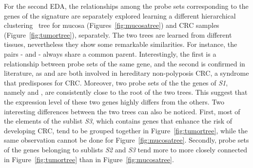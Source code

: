 For the second EDA, the relationships among the probe sets corresponding to the genes of the signature are separately explored learning a different hierarchical clustering~\cite{hastie2009elements} tree for mucosa (Figures~\ref{fig:mucosatree}) and CRC samples (Figure~\ref{fig:tumortree}), separately.
The two trees are learned from different tissues, nevertheless they show some remarkable similarities. For instance, the pairs \tp- and \msh- always share a common parent. Interestingly, the first is a relationship between probe sets of the same gene, and the second is confirmed in literature, as \msh and \pms are both involved in hereditary non-polyposis CRC, a syndrome that predisposes for CRC.
Moreover, two probe sets of the the genes of \emph{S1}, namely \apc and \ctnnb, are consistently close to the root of the two trees. This suggest that the expression level of these two genes highly differs from the others.
Two interesting differences between the two trees can also be noticed. First, most of the elements of the sublist \emph{S3}, which contains genes that enhance the risk of developing CRC, tend to be grouped together in Figure~\ref{fig:tumortree}, while the same observation cannot be done for Figure~\ref{fig:mucosatree}. Secondly, probe sets of the genes belonging to sublists \emph{S2} and \emph{S3} tend more to more closely connected in Figure~\ref{fig:tumortree} than in Figure~\ref{fig:mucosatree}.

